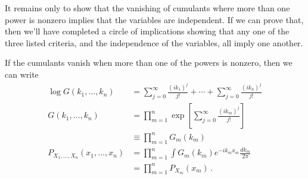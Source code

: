 It remains only to show that the vanishing of cumulants where more than one power is nonzero implies that the variables are independent.
If we can prove that, then we'll have completed a circle of implications showing that any one of the three listed criteria, and the independence of the variables, all imply one another.

If the cumulants vanish when more than one of the powers is nonzero, then we can write
\begin{align*}
  \log G(k_1, \ldots , k_n)
  &= \sum_{j=0}^\infty \frac{(ik_1)^j}{j!} + \cdots + \sum_{j=0}^\infty \frac{(ik_n)^j}{j!} \\
  G(k_1, \ldots , k_n)
  &= \prod_{m=1}^n \exp \left[ \sum_{j=0}^\infty \frac{(ik_m)^j}{j!} \right] \\
  &\equiv \prod_{m=1}^n G_m(k_m) \\
  P_{X_1,\ldots,X_n}(x_1,\ldots,x_n)
  &= \prod_{m=1}^n \int G_m(k_m) e^{-i k_m x_m} \frac{dk_m}{2\pi} \\
  &= \prod_{m=1}^n P_{X_m}(x_m)
  \, .
\end{align*}
